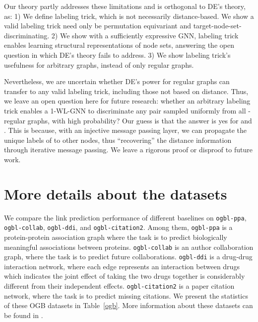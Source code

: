 \documentclass{article}
\begin{document}
Our theory partly addresses these limitations and is orthogonal to DE's theory, as: 1) We define labeling trick, which is not necessarily distance-based. We show a valid labeling trick need only be permutation equivariant and target-node-set-discriminating. 2) We show with a sufficiently expressive GNN, labeling trick enables learning structural representations of node sets, answering the open question in \citep{Srinivasan2020On} which DE's theory fails to address. 3) We show labeling trick's usefulness for arbitrary graphs, instead of only regular graphs.

Nevertheless, we are uncertain whether DE's power for regular graphs can transfer to any valid labeling trick, including those not based on distance. Thus, we leave an open question here for future research: whether an arbitrary labeling trick enables a 1-WL-GNN to discriminate any  pair sampled uniformly from all -regular graphs, with high probability? Our guess is that the answer is yes for  and . This is because, with an injective message passing layer, we can propagate the unique labels of  to other nodes, thus ``recovering'' the distance information through iterative message passing. We leave a rigorous proof or disproof to future work.





\section{More details about the datasets}\label{detaileddatasets}

We compare the link prediction performance of different baselines on \texttt{ogbl-ppa}, \texttt{ogbl-collab},  \texttt{ogbl-ddi}, and \texttt{ogbl-citation2}. Among them, \texttt{ogbl-ppa} is a protein-protein association graph where the task is to predict biologically meaningful associations between proteins. \texttt{ogbl-collab} is an author collaboration graph, where the task is to predict future collaborations. \texttt{ogbl-ddi} is a drug-drug interaction network, where each edge represents an interaction between drugs which indicates the joint effect of taking the two drugs together is considerably different from their independent effects. \texttt{ogbl-citation2} is a paper citation network, where the task is to predict missing citations. We present the statistics of these OGB datasets in Table~\ref{ogb}. More information about these datasets can be found in \citep{hu2020open}.
\end{document}
